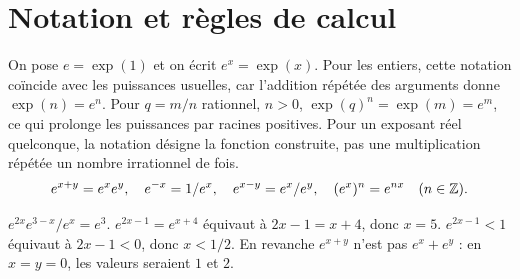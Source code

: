 \documentclass[../cours_1re.tex]{subfiles}
\begin{document}
\section{Notation et règles de calcul}
On pose $e=\exp(1)$ et on écrit $e^x=\exp(x)$. Pour les entiers, cette notation coïncide avec les puissances usuelles, car l'addition répétée des arguments donne $\exp(n)=e^n$.
Pour $q=m/n$ rationnel, $n>0$, $\exp(q)^n=\exp(m)=e^m$, ce qui prolonge les puissances par racines positives.
Pour un exposant réel quelconque, la notation désigne la fonction construite, pas une multiplication répétée un nombre irrationnel de fois.
\[
e^{x+y}=e^xe^y,\quad e^{-x}=1/e^x,\quad
e^{x-y}=e^x/e^y,\quad (e^x)^n=e^{nx}\quad(n\in\mathbb{Z}).
\]
\begin{exemple}
$e^{2x}e^{3-x}/e^x=e^3$.
$e^{2x-1}=e^{x+4}$ équivaut à $2x-1=x+4$, donc $x=5$.
$e^{2x-1}<1$ équivaut à $2x-1<0$, donc $x<1/2$.
En revanche $e^{x+y}$ n'est pas $e^x+e^y$ : en $x=y=0$, les valeurs seraient $1$ et $2$.
\end{exemple}
\end{document}
